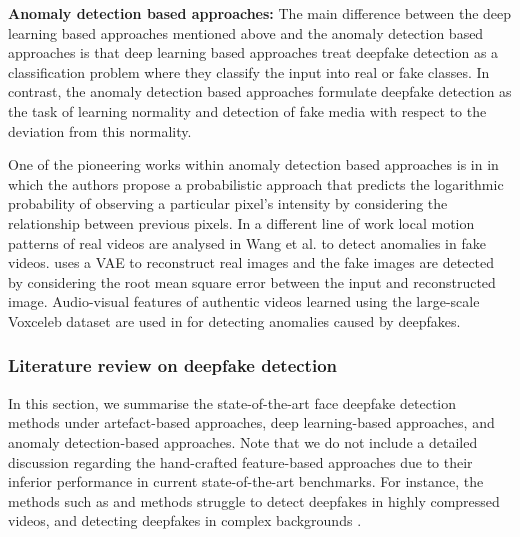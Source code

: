 \noindent\textbf{Anomaly detection based approaches: } The main difference between the deep learning based approaches mentioned above and the anomaly detection based approaches is that deep learning based approaches treat deepfake detection as a classification problem where they classify the input into real or fake classes. In contrast, the anomaly detection based approaches formulate deepfake detection as the task of learning normality and detection of fake media with respect to the deviation from this normality. 

One of the pioneering works within anomaly detection based approaches is in \cite{khodabakhsh2020generalizable} in which the authors propose a probabilistic approach that predicts the logarithmic probability of observing a particular pixel's intensity by considering the relationship between previous pixels. In a different line of work local motion patterns of real videos are analysed in Wang et al. \cite{wang2020exposing} to detect anomalies in fake videos. \cite{khalid2020oc} uses a VAE to reconstruct real images and the fake images are detected by considering the root mean square error between the input and reconstructed image. Audio-visual features of authentic videos learned using the large-scale Voxceleb dataset \cite{nagrani2017voxceleb} are used in \cite{cozzolino2023audio} for detecting anomalies caused by deepfakes.


\subsubsection{Literature review on deepfake detection} 

In this section, we summarise the state-of-the-art face deepfake detection methods under artefact-based approaches, deep learning-based approaches, and anomaly detection-based approaches. Note that we do not include a detailed discussion regarding the hand-crafted feature-based approaches due to their inferior performance in current state-of-the-art benchmarks. For instance, the methods such as \cite{kharbat2019image} and \cite{xia2022towards} methods struggle to detect deepfakes in highly compressed videos, and \cite{wang2022ffr_fd} detecting deepfakes in complex backgrounds \cite{waseem2023deepfake}.

